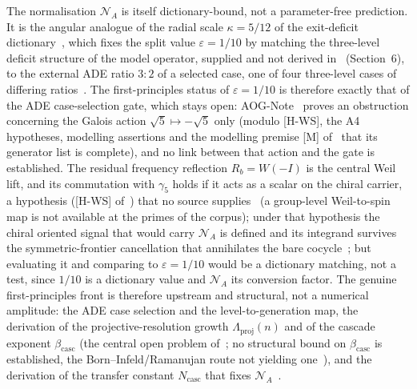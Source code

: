 \documentclass[11pt]{article}
\theoremstyle{definition}
\theoremstyle{remark}
\begin{document}
      The normalisation $\mathcal{N}_A$ is itself dictionary-bound, not a parameter-free prediction.
      It is the angular analogue of the radial scale $\kappa = 5/12$ of the exit-deficit dictionary~\cite{Beau2026aar,
    Beau2026q14}, which fixes the split value $\varepsilon = 1/10$ by matching the three-level deficit structure of the model operator, supplied and not derived
    in~\cite{Beau2026q14} (Section~6),
      to the external ADE ratio $3{:}2$ of a selected case, one of four three-level cases of differing
      ratios~\cite{Beau2026a4}.
      The first-principles status of $\varepsilon = 1/10$ is therefore exactly that of the ADE case-selection gate, which
      stays open: AOG-Note~\cite{Beau2026aog} proves an obstruction concerning the Galois action $\sqrt{5}\mapsto-\sqrt{5}$
      only (modulo [H-WS], the A4 hypotheses, modelling assertions and the modelling premise [M] of~\cite{Beau2026aog} that its generator list is complete), and no link between that action and the gate is established.
      The residual frequency reflection $R_b = W(-I)$ is the central Weil lift, and its commutation with $\gamma_5$
      holds if it acts as a scalar on the chiral carrier, a hypothesis ([H-WS] of~\cite{Beau2026q11of}) that no source
      supplies~\cite{Beau2026q14} (a group-level Weil-to-spin map is not available at the primes of the corpus); under that
      hypothesis the chiral oriented
      signal that would carry $\mathcal{N}_A$ is defined and its integrand survives the symmetric-frontier cancellation
      that annihilates the bare cocycle~\cite{Beau2026q11of, Beau2026aar}; but evaluating it and comparing to
      $\varepsilon = 1/10$ would be a dictionary matching, not a test,
      since $1/10$ is a dictionary value and $\mathcal{N}_A$ its conversion factor.
      The genuine first-principles front is therefore upstream and structural, not a numerical amplitude: the ADE case
      selection and the level-to-generation map, the derivation of the projective-resolution growth
      $\Lambda_{\mathrm{proj}}(n)$ and of the cascade exponent $\beta_{\mathrm{casc}}$ (the central open problem
      of~\cite{Beau2026a4}; no structural bound on $\beta_{\mathrm{casc}}$ is established, the Born--Infeld/Ramanujan route not
      yielding one~\cite{Beau2026a8}), and the derivation of the transfer constant $N_{\mathrm{casc}}$ that
      fixes $\mathcal{N}_A$~\cite{Beau2026q14}.

      \newpage

      
      
\end{document}
